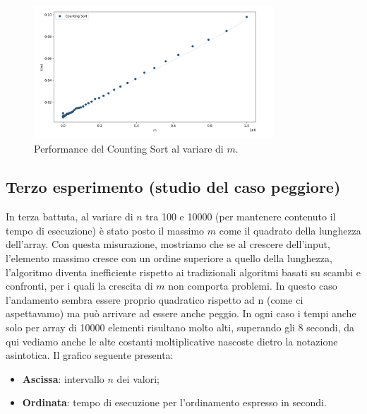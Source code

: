 \documentclass[a4paper, 12pt, oneside]{book}
\begin{document}
\begin{figure}[H]
    \centering
    \includegraphics[width=0.8\textwidth]{images/grafico_counting_sort_m.png}
    \caption{Performance del Counting Sort al variare di \(m\).}
    \label{fig:counting_sort_m}
\end{figure}

\subsection{Terzo esperimento (studio del caso peggiore)}
\noindent In terza battuta, al variare di \(n\) tra 100 e 10000 (per mantenere contenuto il tempo di esecuzione) è stato posto il massimo \(m\) come il quadrato della lunghezza dell'array. Con questa misurazione, mostriamo che se al crescere dell'input, l'elemento massimo cresce con un ordine superiore a quello della lunghezza, l'algoritmo diventa inefficiente rispetto ai tradizionali algoritmi basati su scambi e confronti, per i quali la crescita di \(m\) non comporta problemi. In questo caso l'andamento sembra essere proprio quadratico rispetto ad n (come ci aspettavamo) ma può arrivare ad essere anche peggio. In ogni caso i tempi anche solo per array di 10000 elementi risultano molto alti, superando gli 8 secondi, da qui vediamo anche le alte costanti moltiplicative nascoste dietro la notazione asintotica.
Il grafico seguente presenta:
\begin{itemize}
    \item \textbf{Ascissa}: intervallo \(n\) dei valori;
    \item \textbf{Ordinata}: tempo di esecuzione per l'ordinamento espresso in secondi.
\end{itemize}
\end{document}
